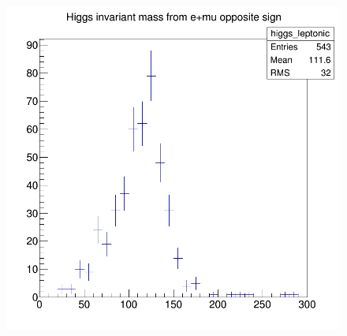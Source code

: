 \documentclass[12pt]{article}
\begin{document}
			  \begin{figure}[h]
			 	\centering
			 	\includegraphics[scale=.31]{e+mu_op.png}
			 \end{figure}
			
	
\end{document}
